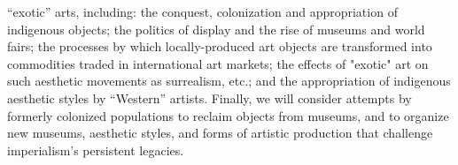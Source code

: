 \begin{description}
        ``exotic'' arts, including: the conquest, colonization and appropriation
        of indigenous objects; the politics of display and the rise of museums
        and world fairs; the processes by which locally-produced art objects are
        transformed into commodities traded in international art markets; the
        effects of "exotic" art on such aesthetic movements as surrealism, etc.;
        and the appropriation of indigenous aesthetic styles by ``Western''
        artists. Finally, we will consider attempts by formerly colonized
        populations to reclaim objects from museums, and to organize new
        museums, aesthetic styles, and forms of artistic production that
        challenge imperialism's persistent legacies.
\end{description}
